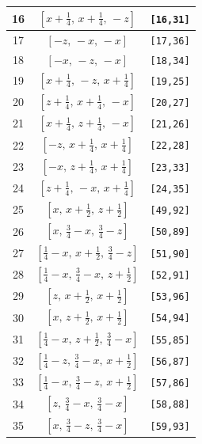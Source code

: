 \documentclass[fleqn,8pt]{jsarticle}
\begin{document}
\begin{longtable}{ccc}
16 & $\left[ x + \frac{1}{4},\, x + \frac{1}{4},\, - z \right]$ & {\tt [16,31]} \\ \hline
17 & $\left[ - z,\, - x,\, - x \right]$ & {\tt [17,36]} \\ \hline
18 & $\left[ - x,\, - z,\, - x \right]$ & {\tt [18,34]} \\ \hline
19 & $\left[ x + \frac{1}{4},\, - z,\, x + \frac{1}{4} \right]$ & {\tt [19,25]} \\ \hline
20 & $\left[ z + \frac{1}{4},\, x + \frac{1}{4},\, - x \right]$ & {\tt [20,27]} \\ \hline
21 & $\left[ x + \frac{1}{4},\, z + \frac{1}{4},\, - x \right]$ & {\tt [21,26]} \\ \hline
22 & $\left[ - z,\, x + \frac{1}{4},\, x + \frac{1}{4} \right]$ & {\tt [22,28]} \\ \hline
23 & $\left[ - x,\, z + \frac{1}{4},\, x + \frac{1}{4} \right]$ & {\tt [23,33]} \\ \hline
24 & $\left[ z + \frac{1}{4},\, - x,\, x + \frac{1}{4} \right]$ & {\tt [24,35]} \\ \hline
25 & $\left[ x,\, x + \frac{1}{2},\, z + \frac{1}{2} \right]$ & {\tt [49,92]} \\ \hline
26 & $\left[ x,\, \frac{3}{4} - x,\, \frac{3}{4} - z \right]$ & {\tt [50,89]} \\ \hline
27 & $\left[ \frac{1}{4} - x,\, x + \frac{1}{2},\, \frac{3}{4} - z \right]$ & {\tt [51,90]} \\ \hline
28 & $\left[ \frac{1}{4} - x,\, \frac{3}{4} - x,\, z + \frac{1}{2} \right]$ & {\tt [52,91]} \\ \hline
29 & $\left[ z,\, x + \frac{1}{2},\, x + \frac{1}{2} \right]$ & {\tt [53,96]} \\ \hline
30 & $\left[ x,\, z + \frac{1}{2},\, x + \frac{1}{2} \right]$ & {\tt [54,94]} \\ \hline
31 & $\left[ \frac{1}{4} - x,\, z + \frac{1}{2},\, \frac{3}{4} - x \right]$ & {\tt [55,85]} \\ \hline
32 & $\left[ \frac{1}{4} - z,\, \frac{3}{4} - x,\, x + \frac{1}{2} \right]$ & {\tt [56,87]} \\ \hline
33 & $\left[ \frac{1}{4} - x,\, \frac{3}{4} - z,\, x + \frac{1}{2} \right]$ & {\tt [57,86]} \\ \hline
34 & $\left[ z,\, \frac{3}{4} - x,\, \frac{3}{4} - x \right]$ & {\tt [58,88]} \\ \hline
35 & $\left[ x,\, \frac{3}{4} - z,\, \frac{3}{4} - x \right]$ & {\tt [59,93]} \\ \hline

\end{longtable}
\end{document}

